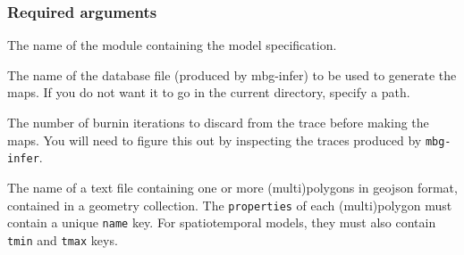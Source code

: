 \subsubsection{Required arguments%
}
\setcounter{listcnt0}{0}
\begin{list}{.}
{
\setlength{\rightmargin}{\leftmargin}
}

\item The name of the module containing the model specification.

\item The name of the database file (produced by mbg-infer) to be used to generate the
maps. If you do not want it to go in the current directory, specify a path.

\item The number of burnin iterations to discard from the trace before making the maps.
You will need to figure this out by inspecting the traces produced by \texttt{mbg-infer}.

\item The name of a text file containing one or more (multi)polygons in geojson format,
contained in a geometry collection. The \texttt{properties} of each (multi)polygon must
contain a unique \texttt{name} key. For spatiotemporal models, they must also contain
\texttt{tmin} and \texttt{tmax} keys.
\end{list}




